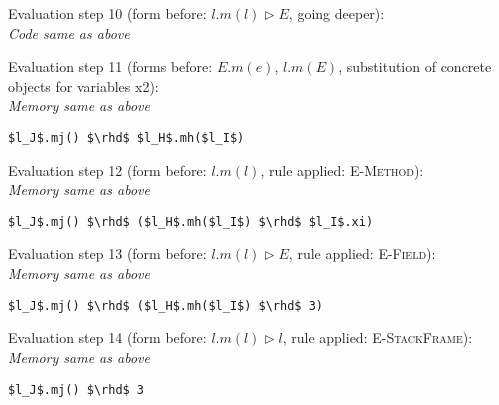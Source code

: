 \documentclass{llncs}
\begin{document}
\vspace{12pt}
\noindent Evaluation step 10 (form before: $l.m(l) \rhd E$, going deeper):\\
\textit{Code same as above}

\vspace{12pt}
\noindent Evaluation step 11 (forms before: $E.m(e)$, $l.m(E)$, substitution of concrete objects for variables x2):\\
\vspace{-6pt}
\indent\textit{Memory same as above}\\
\vspace{-6pt}
\begin{lstlisting}[xleftmargin=20pt]
$l_J$.mj() $\rhd$ $l_H$.mh($l_I$)
\end{lstlisting}

\vspace{12pt}
\noindent Evaluation step 12 (form before: $l.m(l)$, rule applied: \textsc{E-Method}):\\
\vspace{-6pt}
\indent\textit{Memory same as above}\\
\vspace{-6pt}
\begin{lstlisting}[xleftmargin=20pt]
$l_J$.mj() $\rhd$ ($l_H$.mh($l_I$) $\rhd$ $l_I$.xi)
\end{lstlisting}

\vspace{12pt}
\noindent Evaluation step 13 (form before: $l.m(l) \rhd E$, rule applied: \textsc{E-Field}):\\
\vspace{-6pt}
\indent\textit{Memory same as above}\\
\vspace{-6pt}
\begin{lstlisting}[xleftmargin=20pt]
$l_J$.mj() $\rhd$ ($l_H$.mh($l_I$) $\rhd$ 3)
\end{lstlisting}

\vspace{12pt}
\noindent Evaluation step 14 (form before: $l.m(l) \rhd l$, rule applied: \textsc{E-StackFrame}):\\
\vspace{-6pt}
\indent\textit{Memory same as above}\\
\vspace{-6pt}
\begin{lstlisting}[xleftmargin=20pt]
$l_J$.mj() $\rhd$ 3
\end{lstlisting}
\end{document}
